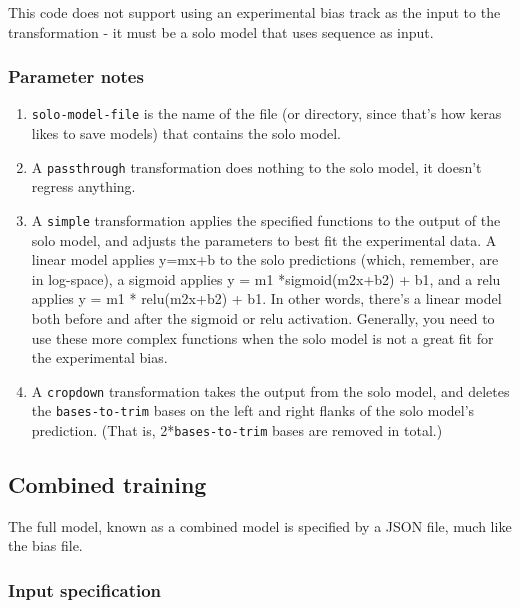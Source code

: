 \documentclass{article}
\begin{document}
This code does not support using an experimental bias track as the input to the 
transformation - it must be a solo model that uses sequence as input.

\subsubsection{Parameter notes}

\begin{enumerate}
    \item \texttt{solo-model-file} is the name of the file (or directory, since that's how keras likes to save models) that contains the solo model. 
    \item A \texttt{passthrough} transformation does nothing to the solo model, it doesn't regress anything. 
    \item A \texttt{simple} transformation applies the specified functions to the output of the solo model, and adjusts the parameters to best fit the experimental data. A linear model applies y=mx+b to the solo predictions (which, remember, are in log-space), a sigmoid applies y = m1 *sigmoid(m2x+b2) + b1, and a relu applies y = m1 * relu(m2x+b2) + b1. In other words, there's a linear model both before and after the sigmoid or relu activation. Generally, you need to use these more complex functions when the solo model is not a great fit for the experimental bias. 
    \item A \texttt{cropdown} transformation takes the output from the solo model, and deletes the \texttt{bases-to-trim} bases on the left and right flanks of the solo model's prediction. (That is, 2*\texttt{bases-to-trim} bases are removed in total.)
\end{enumerate}


\subsection{Combined training}

The full model, known as a combined model is specified by a JSON file, much like the bias file.

\subsubsection{Input specification}
\end{document}
